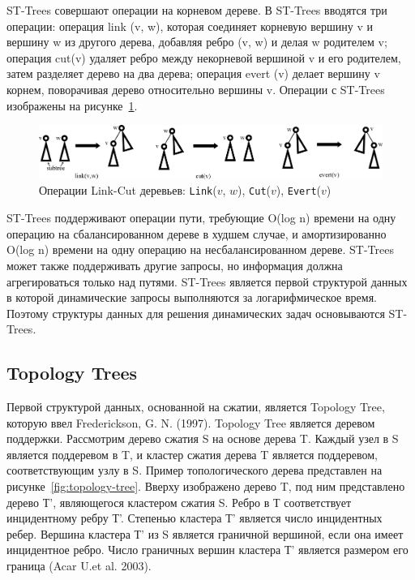 \documentclass[specification,annotation]{itmo-student-thesis}
\begin{document}
ST-Trees совершают операции на корневом дереве. В ST-Trees вводятся три операции: операция link (v, w), которая соединяет корневую вершину v и вершину w из 
другого дерева, добавляя ребро (v, w) и делая w родителем v; операция cut(v) удаляет ребро между некорневой вершиной v и его родителем, затем разделяет дерево 
на два дерева; операция evert (v) делает вершину v корнем, поворачивая дерево относительно вершины v. Операции с ST-Trees изображены на 
рисунке~\ref{fig:link-cut-tree}.

\begin{figure}[!ht]
\centering
\includegraphics[width=\textwidth]{pic/link-cut-tree.png}
\caption{Операции Link-Cut деревьев: \texttt{Link}($v$, $w$), \texttt{Cut}($v$), \texttt{Evert}($v$)}\label{fig:link-cut-tree}
\end{figure}

ST-Trees поддерживают операции пути, требующие O(log n) времени на одну операцию на сбалансированном дереве в худшем случае, и амортизированно O(log n) времени 
на одну операцию на несбалансированном дереве. ST-Trees может также поддерживать другие запросы, но информация должна агрегироваться только над путями. 
ST-Trees является первой структурой данных в которой динамические запросы выполняются за логарифмическое время. Поэтому структуры данных для решения 
динамических задач основываются ST-Trees. 

\subsection{Topology Trees}

Первой структурой данных, основанной на сжатии, является Topology Tree, которую ввел Frederickson, G. N. (1997). Topology Tree является деревом поддержки.
Рассмотрим дерево сжатия S на основе дерева T. Каждый узел в S является поддеревом в T, и кластер сжатия дерева T является поддеревом, соответствующим узлу в 
S. Пример топологического дерева представлен на рисунке~\ref{fig:topology-tree}. Вверху изображено дерево T, под ним представлено дерево Т', являющегося 
кластером сжатия S. Ребро в Т соответствует инцидентному ребру Т'. Степенью кластера Т' является число инцидентных ребер. Вершина кластера Т' из S является 
граничной вершиной, если она имеет инцидентное ребро. Число граничных вершин кластера Т' является размером его граница (Acar U.et al. 2003).
\end{document}
